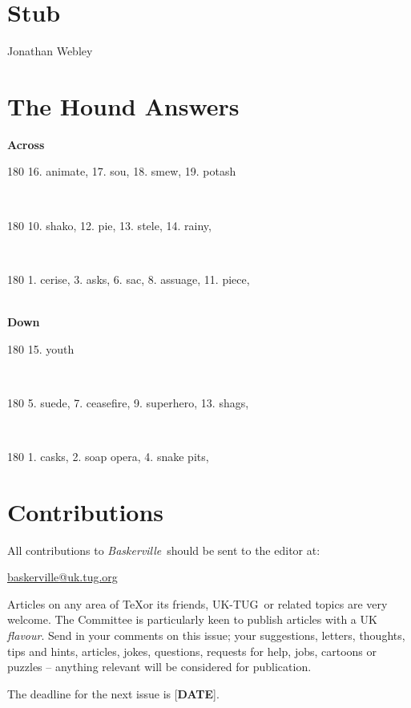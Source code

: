 \documentclass[a4paper,twoside,twocolumn]{article}
\def \ukt {UK-TUG}
\newcommand{\BV}{\textit{Baskerville}}
\newcommand{\AUTHOR}[1]
{
\textsf{#1} \vspace{1em}
}
\begin{document}
\section{Stub}

\AUTHOR{Jonathan Webley}





\section{The Hound Answers}

\noindent \textbf{Across} \\
\begin{turn}{180} 
 16. animate,
 17. sou,
 18. smew,
 19. potash
\end{turn} \\
\begin{turn}{180}
 10. shako,
 12. pie,
 13. stele,
 14. rainy,
 \end{turn} \\
\begin{turn}{180}
 1. cerise,
 3. asks,
 6. sac,
 8. assuage,
 11. piece,
\end{turn} \\

\noindent \textbf{Down} \\
\begin{turn}{180}
15. youth
\end{turn} \\
\begin{turn}{180}
5. suede,
7. ceasefire,
9. superhero,
13. shags,
\end{turn} \\
\begin{turn}{180}
1. casks,
2. soap opera,
4. snake pits,
\end{turn}

\section{Contributions}
\noindent All contributions to \BV\ should be sent to the editor at:
\begin{center}
\href{mailto:baskerville@uk.tug.org}{baskerville@uk.tug.org}
\end{center}

Articles on any area of \TeX or its friends, \ukt\ or related topics are very welcome. The Committee is particularly keen to publish articles with a UK \textit{flavour}. Send in your comments on this issue; your suggestions, letters, thoughts, tips and hints, articles, jokes, questions, requests for help, jobs, cartoons or puzzles -- anything relevant will be considered for publication.

The deadline for the next issue is [\textbf{DATE}]. 
\end{document}
